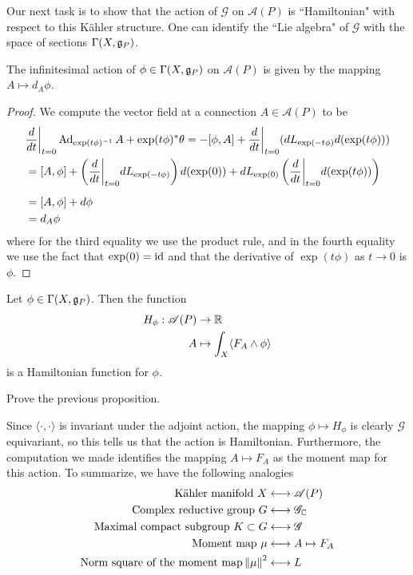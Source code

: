 Our next task is to show that the action of $\mathscr{G}$ on $\mathscr{A}(P)$ is
``Hamiltonian" with respect to this K\"ahler structure. One can
identify the ``Lie algebra" of $\mathscr{G}$ with the space of
sections $\Gamma(X,\mathfrak{g}_P)$.
%
\begin{prop}
The infinitesimal action of $\phi \in \Gamma(X,\mathfrak{g}_P)$ on $\mathscr{A}(P)$ is
given by the mapping $A \mapsto d_A\phi$.
\end{prop}
%
\begin{proof}
We compute the vector field at a connection $A \in \mathscr{A}(P)$ to be
\begin{align*}
&\frac{d}{dt}\bigg\vert_{t=0} \operatorname{Ad}_{\exp(t\phi)^{-1}} A + \exp(t\phi)^*\theta
= -[\phi, A] + \frac{d}{dt}\bigg\vert_{t=0}(dL_{\exp(-t\phi)} d(\exp(t\phi))) \\
&= [A,\phi] + \left(\frac{d}{dt}\bigg\vert_{t=0} dL_{\exp(-t\phi)}\right)d(\exp(0))
+ dL_{\exp(0)}\left(\frac{d}{dt}\bigg\vert_{t=0}d(\exp(t\phi))\right) \\[5pt]
&= [A,\phi] + d\phi\\
&= d_A\phi
\end{align*}
where for the third equality we use the product rule, and in the fourth equality
we use the fact that $\exp(0) = \operatorname{id}$ and that the derivative of
$\exp(t\phi)$ as $t \to 0$ is $\phi$.
\end{proof}
%
\begin{prop}
Let $\phi \in \Gamma(X,\mathfrak{g}_P)$. Then the function
\begin{align*}
H_\phi : \mathscr{A}(P) &\to \mathbb{R} \\
A &\mapsto \int_X\langle F_A\wedge\phi\rangle
\end{align*}
is a Hamiltonian function for $\phi$.
\end{prop}
%
\begin{exer}
Prove the previous proposition.
\end{exer}
%
Since $\langle\cdot,\cdot\rangle$ is invariant under the adjoint action,
the mapping $\phi \mapsto H_\phi$ is clearly $\mathscr{G}$ equivariant,
so this tells us that the action is Hamiltonian. Furthermore,
the computation we made identifies the mapping $A \mapsto F_A$ as the
moment map for this action. To summarize, we have the following
analogies
%
\begin{align*}
\text{K\"ahler manifold }X &\longleftrightarrow \mathscr{A}(P) \\
\text{Complex reductive group }G &\longleftrightarrow \mathscr{G}_{\mathbb{C}} \\
\text{Maximal compact subgroup }K \subset G &\longleftrightarrow \mathscr{G} \\
\text{Moment map }\mu &\longleftrightarrow A \mapsto F_A \\
\text{Norm square of the moment map} \left\lVert\mu\right\rVert^2 &\longleftrightarrow L
\end{align*}
